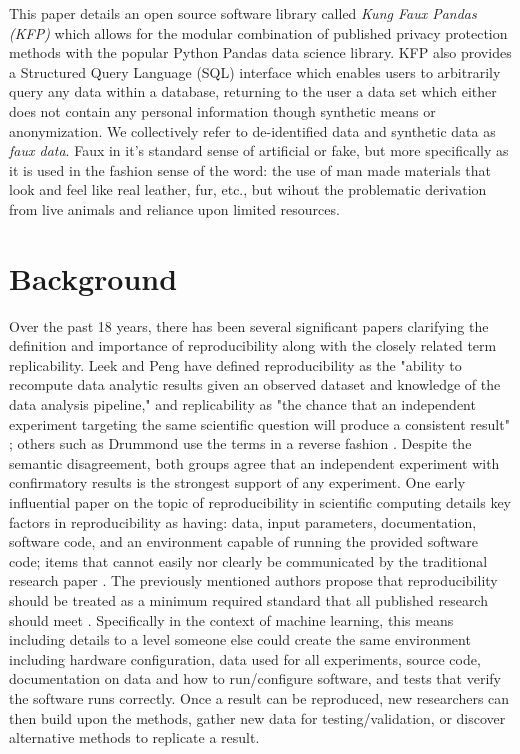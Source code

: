 \documentclass{article}
\begin{document}
This paper details an open source software library called \emph{Kung Faux Pandas (KFP)} which allows for the modular combination of published privacy protection methods with the popular Python Pandas data science library\cite{mckinney-proc-scipy-2010}. KFP also provides a Structured Query Language (SQL) interface which enables users to arbitrarily query any data within a database, returning to the user a data set which either does not contain any personal information though synthetic means or anonymization. We collectively refer to de-identified data and synthetic data as \emph{faux data}. Faux in it's standard sense of artificial or fake, but more specifically as it is used in the fashion sense of the word: the use of man made materials that look and feel like real leather, fur, etc., but wihout the problematic derivation from live animals and reliance upon limited resources.

\section{Background}

 Over the past 18 years, there has been several significant papers clarifying the definition and importance of reproducibility along with the closely related term replicability. Leek and Peng have defined reproducibility as the "ability to recompute data analytic results given an observed dataset and knowledge of the data analysis pipeline," and replicability as "the chance that an independent experiment targeting the same scientific question will produce a consistent result" \cite{leek_opinion_2015}; others such as Drummond use the terms in a reverse fashion \cite{drummond_replicability_2009}. Despite the semantic disagreement, both groups agree that an independent experiment with confirmatory results is the strongest support of any experiment. One early influential paper on the topic of reproducibility in scientific computing details key factors in reproducibility as having: data, input parameters, documentation, software code, and an environment capable of running the provided software code; items that cannot easily nor clearly be communicated by the traditional research paper \cite{schwab_making_2000}. The previously mentioned authors propose that reproducibility should be treated as a minimum required standard that all published research should meet \cite{peng_reproducible_2006}. Specifically in the context of machine learning, this means including details to a level someone else could create the same environment including hardware configuration, data used for all experiments, source code, documentation on data and how to run/configure software, and tests that verify the software runs correctly. Once a result can be reproduced, new researchers can then build upon the methods, gather new data for testing/validation, or discover alternative methods to replicate a result.
\end{document}
